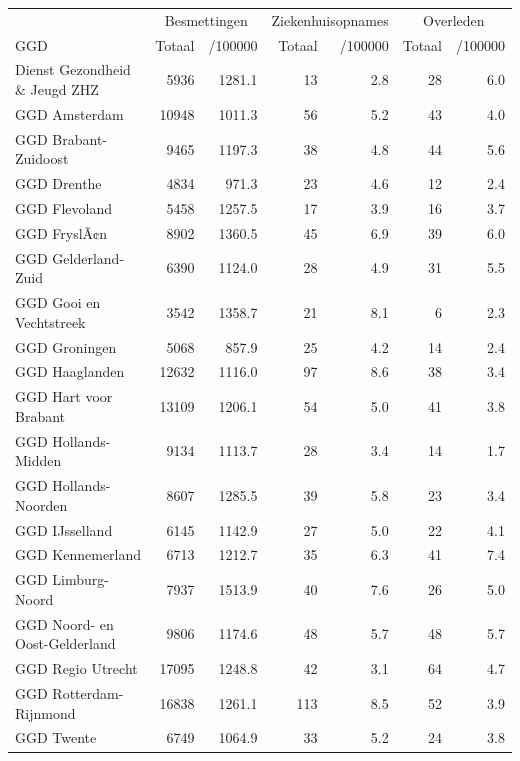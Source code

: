 \documentclass[
  english,
  man,floatsintext]{apa6}
\begin{document}
\begin{table}
\centering\begingroup\fontsize{10}{12}\selectfont

\begin{threeparttable}
\begin{tabular}{lrrrrrr}
\toprule
\multicolumn{1}{c}{ } & \multicolumn{2}{c}{Besmettingen} & \multicolumn{2}{c}{Ziekenhuisopnames} & \multicolumn{2}{c}{Overleden} \\
\cmidrule(l{3pt}r{3pt}){2-3} \cmidrule(l{3pt}r{3pt}){4-5} \cmidrule(l{3pt}r{3pt}){6-7}
GGD & Totaal & /100000 & Totaal & /100000 & Totaal & /100000\\
\midrule
Dienst Gezondheid \& Jeugd ZHZ & 5936 & 1281.1 & 13 & 2.8 & 28 & 6.0\\
GGD Amsterdam & 10948 & 1011.3 & 56 & 5.2 & 43 & 4.0\\
GGD Brabant-Zuidoost & 9465 & 1197.3 & 38 & 4.8 & 44 & 5.6\\
GGD Drenthe & 4834 & 971.3 & 23 & 4.6 & 12 & 2.4\\
GGD Flevoland & 5458 & 1257.5 & 17 & 3.9 & 16 & 3.7\\
GGD FryslÃ¢n & 8902 & 1360.5 & 45 & 6.9 & 39 & 6.0\\
GGD Gelderland-Zuid & 6390 & 1124.0 & 28 & 4.9 & 31 & 5.5\\
GGD Gooi en Vechtstreek & 3542 & 1358.7 & 21 & 8.1 & 6 & 2.3\\
GGD Groningen & 5068 & 857.9 & 25 & 4.2 & 14 & 2.4\\
GGD Haaglanden & 12632 & 1116.0 & 97 & 8.6 & 38 & 3.4\\
GGD Hart voor Brabant & 13109 & 1206.1 & 54 & 5.0 & 41 & 3.8\\
GGD Hollands-Midden & 9134 & 1113.7 & 28 & 3.4 & 14 & 1.7\\
GGD Hollands-Noorden & 8607 & 1285.5 & 39 & 5.8 & 23 & 3.4\\
GGD IJsselland & 6145 & 1142.9 & 27 & 5.0 & 22 & 4.1\\
GGD Kennemerland & 6713 & 1212.7 & 35 & 6.3 & 41 & 7.4\\
GGD Limburg-Noord & 7937 & 1513.9 & 40 & 7.6 & 26 & 5.0\\
GGD Noord- en Oost-Gelderland & 9806 & 1174.6 & 48 & 5.7 & 48 & 5.7\\
GGD Regio Utrecht & 17095 & 1248.8 & 42 & 3.1 & 64 & 4.7\\
GGD Rotterdam-Rijnmond & 16838 & 1261.1 & 113 & 8.5 & 52 & 3.9\\
GGD Twente & 6749 & 1064.9 & 33 & 5.2 & 24 & 3.8\\

\end{tabular}
\end{threeparttable}
\end{table}
\end{document}

